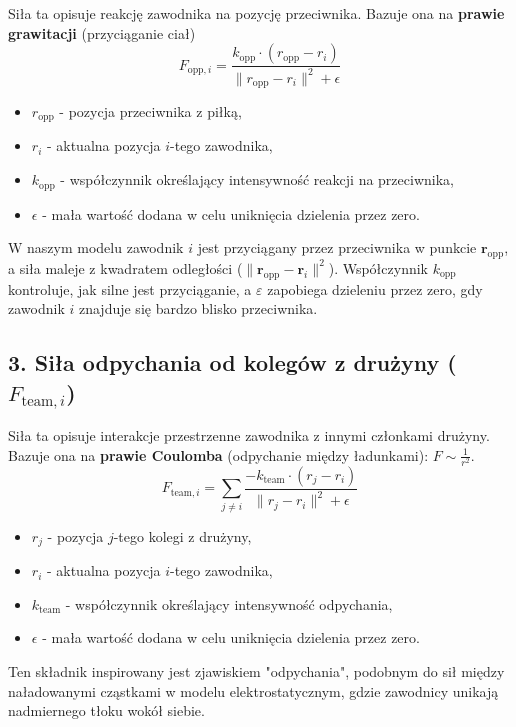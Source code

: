 \documentclass{article}
\begin{document}
Siła ta opisuje reakcję zawodnika na pozycję przeciwnika. Bazuje ona na \textbf{prawie grawitacji} (przyciąganie ciał)
\[
F_{\text{opp}, i} = \frac{k_{\text{opp}} \cdot (r_{\text{opp}} - r_i)}{\|r_{\text{opp}} - r_i\|^2 + \epsilon}
\]
\begin{itemize}
    \item \(r_{\text{opp}}\) - pozycja przeciwnika z piłką,
    \item \(r_i\) - aktualna pozycja \(i\)-tego zawodnika,
    \item \(k_{\text{opp}}\) - współczynnik określający intensywność reakcji na przeciwnika,
    \item \(\epsilon\) - mała wartość dodana w celu uniknięcia dzielenia przez zero.
\end{itemize}
W naszym modelu zawodnik $i$ jest przyciągany przez przeciwnika w punkcie $\mathbf{r}_{\text{opp}}$, a siła maleje z kwadratem odległości ($\|\mathbf{r}_{\text{opp}} - \mathbf{r}_i\|^2$). Współczynnik $k_{\text{opp}}$ kontroluje, jak silne jest przyciąganie, a $\varepsilon$ zapobiega dzieleniu przez zero, gdy zawodnik $i$ znajduje się bardzo blisko przeciwnika.

\subsection*{3. Siła odpychania od kolegów z drużyny (\(F_{\text{team}, i}\))}

Siła ta opisuje interakcje przestrzenne zawodnika z innymi członkami drużyny. Bazuje ona na \textbf{prawie Coulomba} (odpychanie między ładunkami): \(F \sim \frac{1}{r^2}\).
\[
F_{\text{team}, i} = \sum_{j \neq i} \frac{-k_{\text{team}} \cdot (r_j - r_i)}{\|r_j - r_i\|^2 + \epsilon}
\]
\begin{itemize}
    \item \(r_j\) - pozycja \(j\)-tego kolegi z drużyny,
    \item \(r_i\) - aktualna pozycja \(i\)-tego zawodnika,
    \item \(k_{\text{team}}\) - współczynnik określający intensywność odpychania,
    \item \(\epsilon\) - mała wartość dodana w celu uniknięcia dzielenia przez zero.
\end{itemize}
Ten składnik inspirowany jest zjawiskiem "odpychania", podobnym do sił między naładowanymi cząstkami w modelu elektrostatycznym, gdzie zawodnicy unikają nadmiernego tłoku wokół siebie.
\end{document}
